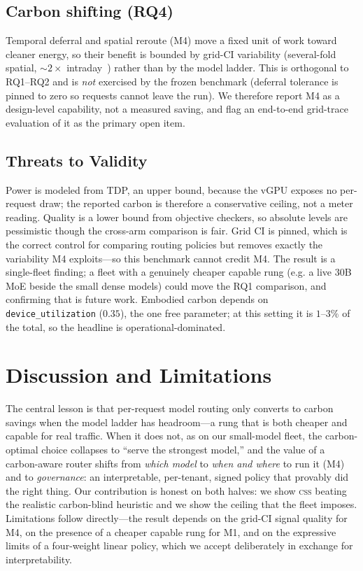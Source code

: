 \documentclass[10pt,twocolumn]{article}
\newcommand{\css}{\textsc{css}}
\begin{document}
\subsection{Carbon shifting (RQ4)}
Temporal deferral and spatial reroute (M4) move a fixed unit of work toward
cleaner energy, so their benefit is bounded by grid-CI variability
(several-fold spatial, $\sim$$2\times$ intraday~\cite{carbon-explorer,wait-awhile})
rather than by the model ladder. This is orthogonal to RQ1--RQ2 and is
\emph{not} exercised by the frozen benchmark (deferral tolerance is pinned to
zero so requests cannot leave the run). We therefore report M4 as a
design-level capability, not a measured saving, and flag an end-to-end
grid-trace evaluation of it as the primary open item.

\subsection{Threats to Validity}
Power is modeled from TDP, an upper bound, because the vGPU exposes no
per-request draw; the reported carbon is therefore a conservative ceiling, not
a meter reading. Quality is a lower bound from objective checkers, so absolute
levels are pessimistic though the cross-arm comparison is fair. Grid CI is
pinned, which is the correct control for comparing routing policies but removes
exactly the variability M4 exploits---so this benchmark cannot credit M4. The
result is a single-fleet finding; a fleet with a genuinely cheaper capable rung
(e.g. a live $30$B MoE beside the small dense models) could move the RQ1
comparison, and confirming that is future work. Embodied carbon depends on
\texttt{device\_utilization} ($0.35$), the one free parameter; at this setting
it is $1$--$3\%$ of the total, so the headline is operational-dominated.

\section{Discussion and Limitations}
\label{sec:discussion}
The central lesson is that per-request model routing only converts to carbon
savings when the model ladder has headroom---a rung that is both cheaper and
capable for real traffic. When it does not, as on our small-model fleet, the
carbon-optimal choice collapses to ``serve the strongest model,'' and the
value of a carbon-aware router shifts from \emph{which model} to \emph{when and
where} to run it (M4) and to \emph{governance}: an interpretable, per-tenant,
signed policy that provably did the right thing. Our contribution is honest on
both halves: we show \css{} beating the realistic carbon-blind heuristic and we
show the ceiling that the fleet imposes. Limitations follow directly---the
result depends on the grid-CI signal quality for M4, on the presence of a
cheaper capable rung for M1, and on the expressive limits of a four-weight
linear policy, which we accept deliberately in exchange for interpretability.
\end{document}
